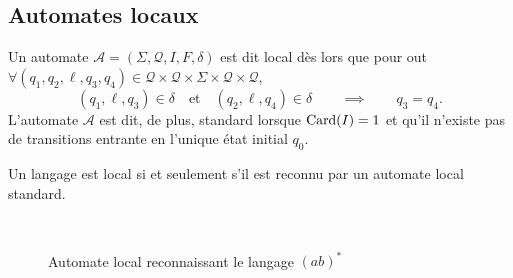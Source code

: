 \subsection{Automates locaux}

\begin{defn}
	Un automate $\mathcal{A} = (\Sigma, \mathcal{Q}, I, F, \delta)$\/ est dit local dès lors que pour out $\forall (q_1,q_2,\ell,q_3,q_4) \in \mathcal{Q}\times \mathcal{Q}\times \Sigma\times \mathcal{Q}\times \mathcal{Q}$, \[
		(q_1,\ell,q_3) \in \delta \quad\text{et}\quad(q_2,\ell,q_4) \in \delta \qquad\implies\qquad q_3 = q_4
	.\]
	L'automate $\mathcal{A}$\/ est dit, de plus, standard lorsque $\operatorname{Card}(I) = 1$\/ et qu'il n'existe pas de transitions entrante en l'unique état initial $q_0$.
\end{defn}

\begin{prop}
	Un langage est local si et seulement s'il est reconnu par un automate local standard.
\end{prop}

\begin{exm}~\\
	\begin{figure}[H]
		\centering
		\caption{Automate local reconnaissant le langage $(ab)^*$}
	\end{figure}
\end{exm}


